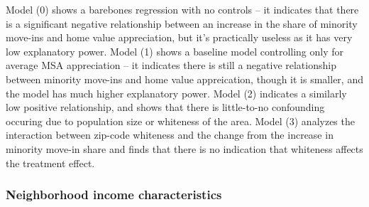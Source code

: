 \documentclass[11pt]{article}
\begin{document}
    Model (0) shows a barebones regression with no controls -- it indicates
that there is a significant negative relationship between an increase in
the share of minority move-ins and home value appreciation, but it's
practically useless as it has very low explanatory power. Model (1)
shows a baseline model controlling only for average MSA appreciation --
it indicates there is still a negative relationship between minority
move-ins and home value appreication, though it is smaller, and the
model has much higher explanatory power. Model (2) indicates a similarly
low positive relationship, and shows that there is little-to-no
confounding occuring due to population size or whiteness of the area.
Model (3) analyzes the interaction between zip-code whiteness and the
change from the increase in minority move-in share and finds that there
is no indication that whiteness affects the treatment effect.

    \subsubsection{Neighborhood income
characteristics}\label{neighborhood-income-characteristics}
\end{document}
